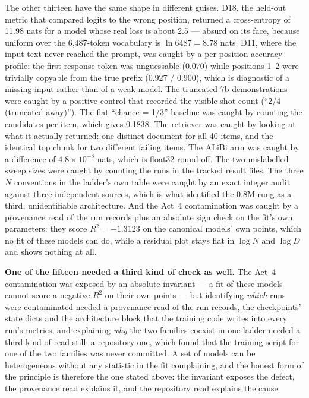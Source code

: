 \documentclass[11pt,a4paper]{article}
\begin{document}
The other thirteen have the same shape in different guises. D18, the held-out
metric that compared logits to the wrong position, returned a cross-entropy of
11.98 nats for a model whose real loss is about 2.5 --- absurd on its face,
because uniform over the 6,487-token vocabulary is $\ln 6487 = 8.78$ nats.
D11, where the input text never reached the prompt, was caught by a
per-position accuracy profile: the first response token was unguessable
(0.070) while positions 1--2 were trivially copyable from the true prefix
(0.927 / 0.900), which is diagnostic of a missing input rather than of a weak
model. The truncated 7b demonstrations were caught by a positive control that
recorded the visible-shot count (``2/4 (truncated away)''). The flat
``chance = 1/3'' baseline was caught by counting the candidates per item,
which gives 0.1838. The retriever was caught by looking at what it actually
returned: one distinct document for all 40 items, and the identical top chunk
for two different failing items. The ALiBi arm was caught by a difference of
$4.8\times10^{-8}$ nats, which is float32 round-off. The two mislabelled
sweep sizes were caught by counting the runs in the tracked result files. The
three $N$ conventions in the ladder's own table were caught by an exact
integer audit against three independent sources, which is what identified the
0.8M rung as a third, unidentifiable architecture. And the Act~4 contamination
was caught by a provenance read of the run records plus an absolute sign check
on the fit's own parameters: they score $R^2 = -1.3123$ on the canonical
models' own points, which no fit of these models can do, while a residual plot
stays flat in $\log N$ and $\log D$ and shows nothing at all.

\textbf{One of the fifteen needed a third kind of check as well.} The Act~4
contamination was exposed by an absolute invariant --- a fit of these models
cannot score a negative $R^2$ on their own points --- but identifying
\emph{which} runs were contaminated needed a provenance read of the run
records, the checkpoints' state dicts and the architecture block that the
training code writes into every run's metrics, and explaining \emph{why} the
two families coexist in one ladder needed a third kind of read still: a
repository one, which found that the training script for one of the two
families was never committed. A set of models can be heterogeneous without
any statistic in the fit complaining, and the honest form of the principle is
therefore the one stated above: the invariant exposes the defect, the
provenance read explains it, and the repository read explains the cause.
\end{document}
